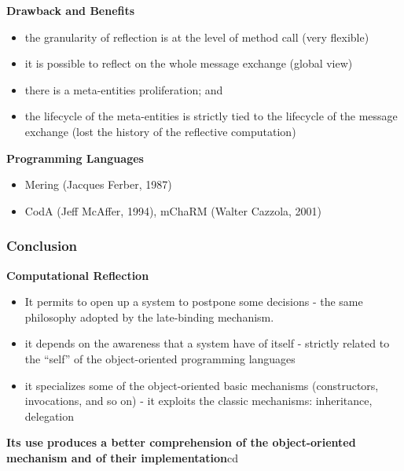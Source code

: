 \textbf{Drawback and Benefits}
\begin{itemize}
	\item the granularity of reflection is at the level of method call (very flexible)
	\item it is possible to reflect on the whole message exchange (global view)
	\item there is a meta-entities proliferation; and
	\item the lifecycle of the meta-entities is strictly tied to the lifecycle of the message exchange (lost the history of the reflective computation)
\end{itemize}

\textbf{Programming Languages}
\begin{itemize}
	\item Mering (Jacques Ferber, 1987)
	\item  CodA (Jeff McAffer, 1994), mChaRM (Walter Cazzola, 2001)
\end{itemize}

\subsubsection{Conclusion}
\textbf{Computational Reflection}
\begin{itemize}
	\item It permits to open up a system to postpone some decisions
	- the same philosophy adopted by the late-binding mechanism.
	\item it depends on the awareness that a system have of itself
	- strictly related to the “self” of the object-oriented programming languages
	\item it specializes some of the object-oriented basic mechanisms (constructors, invocations, and so on)
	- it exploits the classic mechanisms: inheritance, delegation
\end{itemize}

\textbf{Its use produces a better comprehension of the object-oriented mechanism and of their implementation}cd 




